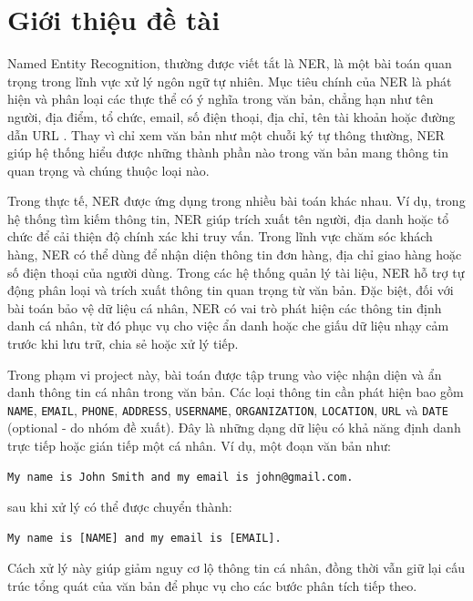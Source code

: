 \section{Giới thiệu đề tài}

Named Entity Recognition, thường được viết tắt là NER, là một bài toán quan trọng trong lĩnh vực xử lý ngôn ngữ tự nhiên. Mục tiêu chính của NER là phát hiện và phân loại các thực thể có ý nghĩa trong văn bản, chẳng hạn như tên người, địa điểm, tổ chức, email, số điện thoại, địa chỉ, tên tài khoản hoặc đường dẫn URL \cite{awan2023ner}. Thay vì chỉ xem văn bản như một chuỗi ký tự thông thường, NER giúp hệ thống hiểu được những thành phần nào trong văn bản mang thông tin quan trọng và chúng thuộc loại nào.


Trong thực tế, NER được ứng dụng trong nhiều bài toán khác nhau. Ví dụ, trong hệ thống tìm kiếm thông tin, NER giúp trích xuất tên người, địa danh hoặc tổ chức để cải thiện độ chính xác khi truy vấn. Trong lĩnh vực chăm sóc khách hàng, NER có thể dùng để nhận diện thông tin đơn hàng, địa chỉ giao hàng hoặc số điện thoại của người dùng. Trong các hệ thống quản lý tài liệu, NER hỗ trợ tự động phân loại và trích xuất thông tin quan trọng từ văn bản. Đặc biệt, đối với bài toán bảo vệ dữ liệu cá nhân, NER có vai trò phát hiện các thông tin định danh cá nhân, từ đó phục vụ cho việc ẩn danh hoặc che giấu dữ liệu nhạy cảm trước khi lưu trữ, chia sẻ hoặc xử lý tiếp.

Trong phạm vi project này, bài toán được tập trung vào việc nhận diện và ẩn danh thông tin cá nhân trong văn bản. Các loại thông tin cần phát hiện bao gồm \texttt{NAME}, \texttt{EMAIL}, \texttt{PHONE}, \texttt{ADDRESS}, \texttt{USERNAME}, \texttt{ORGANIZATION}, \texttt{LOCATION}, \texttt{URL} và \texttt{DATE} (optional - do nhóm đề xuất). Đây là những dạng dữ liệu có khả năng định danh trực tiếp hoặc gián tiếp một cá nhân. Ví dụ, một đoạn văn bản như:

\begin{verbatim}
My name is John Smith and my email is john@gmail.com.
\end{verbatim}

sau khi xử lý có thể được chuyển thành:

\begin{verbatim}
My name is [NAME] and my email is [EMAIL].
\end{verbatim}

Cách xử lý này giúp giảm nguy cơ lộ thông tin cá nhân, đồng thời vẫn giữ lại cấu trúc tổng quát của văn bản để phục vụ cho các bước phân tích tiếp theo.


